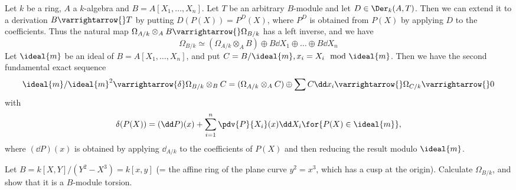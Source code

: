 \documentclass[../main]{subfiles}
\begin{document}
\begin{parexample}
    Let $k$ be a ring, $A$ a $k$-algebra and \newline $B=A[X_1,\dots, X_n]$. Let $T$ be an arbitrary $B$-module and let $D \in \Der_k(A, T)$. Then we can extend it to a derivation $B \varrightarrow{} T$ by putting $D(P(X))=P^D(X)$, where $P^D$ is obtained from $P(X)$ by applying $D$ to the coefficients. Thus the natural map \newline $\Omega_{A / k} \otimes_A B \varrightarrow{} \Omega_{B / k}$ has a left inverse, and we have \[\Omega_{B / k} \simeq(\Omega_{A / k} \otimes_A B) \oplus B\dd X_1 \oplus \dots \oplus B \dd X_n\] Let $\ideal{m}$ be an ideal of $B=A[X_1, \dots, X_n]$, and put $C=B / \ideal{m}, x_i=X_i \mod \ideal{m}$. Then we have the second fundamental exact sequence \[ \ideal{m}/ \ideal{m}^2 \varrightarrow{\delta} \Omega_{B / k} \otimes_B C=(\Omega_{A/k} \otimes_A C) \oplus \sum C\dd x_i \varrightarrow{} \Omega_{C / k} \varrightarrow{} 0\] with \[\delta(P(X))=(\dd P)(x)+\sum_{i=1}^n \pdv{P}{X_i}(x) \dd X_i \for{P(X) \in \ideal{m}},\] where $(\dd P)(x)$ is obtained by applying $\dd_{A / k}$ to the coefficients of $P(X)$ and then reducing the result modulo $\ideal{m}$.
\end{parexample}

\begin{exercise}\label{exe:26.04}
    Let $B=k[X, Y] /(Y^2-X^3)=k[x, y]$ (= the affine ring of the plane curve $y^2=x^3$, which has a cusp at the origin). Calculate $\Omega_{B/k}$, and show that it is a $B$-module torsion.
\end{exercise}
\end{document}
